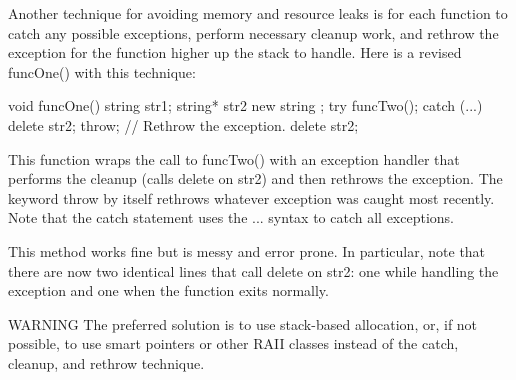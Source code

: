 
Another technique for avoiding memory and resource leaks is for each function to catch any possible exceptions, perform necessary cleanup work, and rethrow the exception for the function higher up the stack to handle. Here is a revised funcOne() with this technique:

\begin{cpp}
void funcOne()
{
    string str1;
    string* str2 { new string {} };
    try {
        funcTwo();
    } catch (...) {
        delete str2;
        throw; // Rethrow the exception.
    }
    delete str2;
}
\end{cpp}

This function wraps the call to funcTwo() with an exception handler that performs the cleanup (calls delete on str2) and then rethrows the exception. The keyword throw by itself rethrows whatever exception was caught most recently. Note that the catch statement uses the ... syntax to catch all exceptions.

This method works fine but is messy and error prone. In particular, note that there are now two identical lines that call delete on str2: one while handling the exception and one when the function exits normally.

\begin{myWarning}{WARNING}
The preferred solution is to use stack-based allocation, or, if not possible, to use smart pointers or other RAII classes instead of the catch, cleanup, and rethrow technique.
\end{myWarning}















